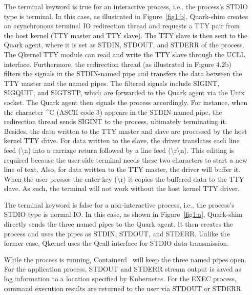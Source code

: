 The terminal keyword is true for an interactive process, i.e., the process’s STDIO type is terminal. In this case, as illustrated in Figure~\ref{fig1:b}, Quark-shim creates an asynchronous terminal IO redirection thread and requests a TTY pair from the host kernel (TTY master and TTY slave). The TTY 
slave is then sent to the Quark agent, where it is set as STDIN, STDOUT, and STDERR of the process. The Qkernel TTY module can read and write the TTY slave through the UCLL interface. Furthermore, the redirection thread (as illustrated in Figure 4.2b) filters the signals in the STDIN-named pipe and 
transfers the data between the TTY master and the named pipes. The filtered signals include SIGINT, SIGQUIT, and SIGTSTP, which are forwarded to the Quark agent via the Unix socket. The Quark agent then signals the process accordingly. For instance, when the character \textasciicircum C (ASCII code 3) appears in 
the STDIN-named pipe, the redirection thread sends SIGINT to the process, ultimately terminating it. Besides, the data written to the TTY master and slave are processed by the host kernel TTY drive. For data written to the slave, the driver translates each line feed (\textbackslash n) into a carriage return
 followed by a line feed (\textbackslash r\textbackslash n). This editing is required because the user-side terminal needs these two characters to start a new line of text. Also, for data written to the TTY master, the driver will buffer it. When the user presses the enter key (\textbackslash r) it 
 copies the buffered data to the TTY slave. As such, the terminal will not work without the host kernel TTY driver.

The terminal keyword is false for a non-interactive process, i.e., the process’s STDIO type is normal IO. In this case, as shown in Figure~\ref{fig1:a}, Quark-shim directly sends the three named pipes to the Quark agent. It then creates the process and uses the pipes as STDIN, STDOUT, and STDERR. 
Unlike the former case, Qkernel uses the Qcall interface for STDIO data transmission.

While the process is running, Containerd~\cite*{containerd} will keep the three named pipes open. For the application process, STDOUT and STDERR stream output is saved as log information to a location specified by Kubernetes. For the EXEC process, command execution results are returned to the user via 
STDOUT or STDERR.


